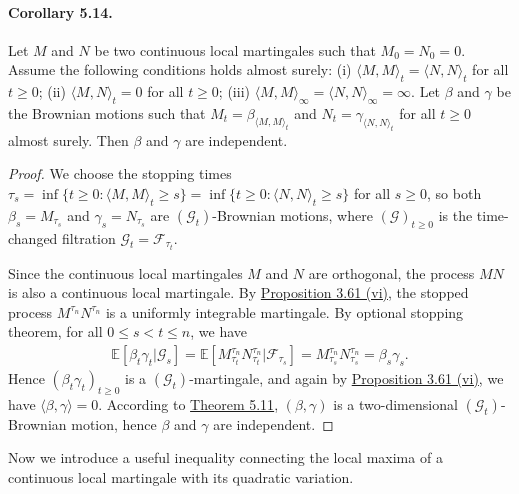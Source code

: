 \documentclass{article}
\numberwithin{equation}{section}
\newcommand{\E}{\mathbb{E}}
\theoremstyle{plain}
\theoremstyle{definition}
\begin{document}
\paragraph{Corollary 5.14.\label{cor:5.14}} Let $M$ and $N$ be two continuous local martingales such that $M_0=N_0=0$. Assume the following conditions holds almost surely: (i) $\langle M,M\rangle_t = \langle N,N\rangle_t$ for all $t\geq 0$; (ii) $\langle M,N\rangle_t=0$ for all $t\geq 0$; (iii) $\langle M,M\rangle_\infty=\langle N,N\rangle_\infty=\infty$. Let $\beta$ and $\gamma$ be the Brownian motions such that $M_t=\beta_{\langle M,M\rangle_t}$ and $N_t=\gamma_{\langle N,N\rangle_t}$ for all $t\geq 0$ almost surely. Then $\beta$ and $\gamma$ are independent.
\begin{proof}
We choose the stopping times $\tau_s=\inf\{t\geq 0:\langle M,M\rangle_t\geq s\}=\inf\{t\geq 0:\langle N,N\rangle_t\geq s\}$ for all $s\geq 0$, so both $\beta_s=M_{\tau_s}$ and $\gamma_s=N_{\tau_s}$ are $(\mathscr{G}_t)$-Brownian motions, where $(\mathscr{G})_{t\geq 0}$ is the time-changed filtration $\mathscr{G}_t=\mathscr{F}_{\tau_t}$.

Since the continuous local martingales $M$ and $N$ are orthogonal, the process $MN$ is also a continuous local martingale. By \hyperref[prop:3.61]{Proposition 3.61 (vi)}, the stopped process $M^{\tau_n}N^{\tau_n}$ is a uniformly integrable martingale. By optional stopping theorem, for all $0\leq s<t\leq n$, we have
\begin{align*}
	\E\left[\beta_t\gamma_t|\mathscr{G}_s\right]=\E\left[M^{\tau_n}_{\tau_t}N^{\tau_n}_{\tau_t}|\mathscr{F}_{\tau_s}\right] = M^{\tau_n}_{\tau_s}N^{\tau_n}_{\tau_s} = \beta_s\gamma_s.
\end{align*}
Hence $(\beta_t\gamma_t)_{t\geq 0}$ is a $(\mathscr{G}_t)$-martingale, and again by \hyperref[prop:3.61]{Proposition 3.61 (vi)}, we have $\langle\beta,\gamma\rangle=0$. According to \hyperref[thm:5.11]{Theorem 5.11}, $(\beta,\gamma)$ is a two-dimensional $(\mathscr{G}_t)$-Brownian motion, hence $\beta$ and $\gamma$ are independent.
\end{proof}

Now we introduce a useful inequality connecting the local maxima of a continuous local martingale with its quadratic variation.
\end{document}
